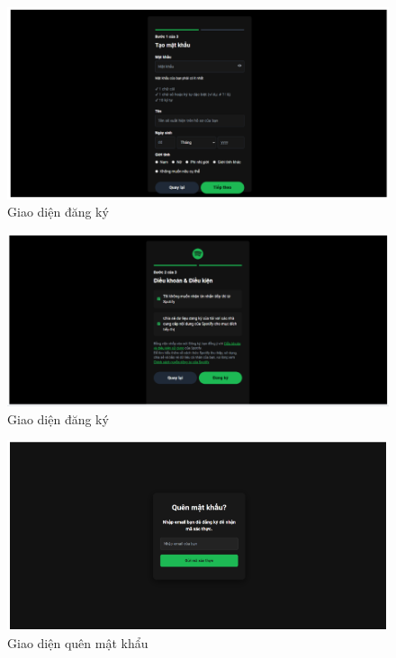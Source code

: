 \begin{figure}
    \centering
    \includegraphics[width=1\linewidth]{images/ui-signup1.png}
    \caption{Giao diện đăng ký}
    \label{fig:ui-signup1.png}
\end{figure}

\begin{figure}
    \centering
    \includegraphics[width=1\linewidth]{images/ui-signup2.png}
    \caption{Giao diện đăng ký}
    \label{fig:ui-signup2.png}
\end{figure}

\begin{figure}
    \centering
    \includegraphics[width=1\linewidth]{images/ui-forgot.png}
    \caption{Giao diện quên mật khẩu}
    \label{fig:ui-forgot}
\end{figure}

